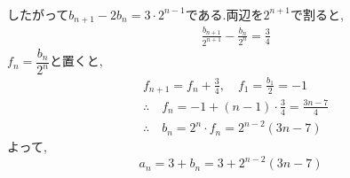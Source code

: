 \begin{enumerate}[label=(\arabic*),parsep=3pt,format=\bookitemlink{example-three-term-2}{solution}{problem}]
\begin{align*}
            \end{align*}
            したがって$b_{n+1}-2b_n=3\cdot2^{n-1}$である.両辺を$2^{n+1}$で割ると,
            \begin{align*}
              &\frac{b_{n+1}}{2^{n+1}}-\frac{b_n}{2^n}=\frac34
            \end{align*}
            $f_n=\dfrac{b_n}{2^n}$と置くと,
            \begin{align*}
              &f_{n+1}=f_n+\frac34,\quad f_1=\frac{b_1}{2}=-1\\
              &\therefore \quad f_n=-1+(n-1)\cdot\frac34=\frac{3n-7}{4}\\
              &\therefore \quad b_n=2^n\cdot f_n=2^{n-2}(3n-7)
            \end{align*}
            よって,
            \[
              a_n=3+b_n=3+2^{n-2}(3n-7)
            \]
    \end{enumerate}
